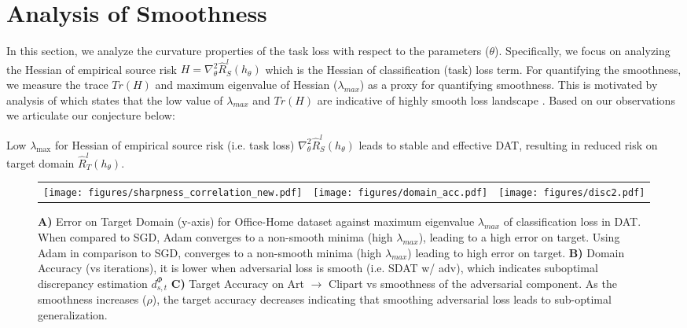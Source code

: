 \documentclass[table,dvipsnames]{article}
\theoremstyle{plain}
\theoremstyle{definition}
\theoremstyle{remark}
\begin{document}
\section{Analysis of Smoothness} \label{smoothness}
In this section, we analyze the curvature properties of the task loss with respect to the parameters ($\theta$). Specifically, we focus on analyzing the Hessian of empirical source risk $H = \nabla^2_{\theta} \hat{R}_S^l(h_{\theta})$ which is the Hessian of classification ({task}) loss term. For quantifying the smoothness, we measure the trace $Tr(H)$ and maximum eigenvalue of Hessian ($\lambda_{max}$) as a proxy for quantifying smoothness. 
This is motivated by analysis of 
which states that the low value of $\lambda_{max}$ and $Tr(H)$ are indicative of highly smooth loss landscape \citep{Jastrzebski2020The}. Based on our observations we articulate our conjecture below: 
\begin{conjecture}
  Low $\lambda_{\max}$ for Hessian  of empirical source risk (i.e. task loss) $\nabla^2_{\theta}\hat{R}_S^l(h_{\theta})$ leads to stable and effective DAT, resulting in reduced risk on target domain  $\hat{R}^l_{T}(h_{\theta})$.
  
\end{conjecture}

\begin{figure*}[t]
\centering
\begin{tabular}{c c c}
\texttt{[image: figures/sharpness\_correlation\_new.pdf]} &   \texttt{[image: figures/domain\_acc.pdf]} & \texttt{[image: figures/disc2.pdf]} \\
\end{tabular}
\caption{\textbf{A)} Error on Target Domain (y-axis) for Office-Home dataset against maximum eigenvalue $\lambda_{max}$ of classification loss in DAT. 
When compared to SGD, Adam converges to a non-smooth minima (high $\lambda_{max}$), leading to a high error on target. 
Using Adam in comparison to SGD, converges to a non-smooth minima (high $\lambda_{max}$) leading to high error on target.
\textbf{B)} Domain Accuracy (vs iterations), it is lower when adversarial loss is smooth (i.e. SDAT w/ adv), which indicates suboptimal discrepancy estimation $d_{s,t}^{\Phi}$ \textbf{C)} Target Accuracy on Art $\rightarrow$ Clipart vs smoothness of the adversarial component. As the smoothness increases ($\rho$), the target accuracy decreases indicating that smoothing adversarial loss leads to sub-optimal generalization.}
\label{fig:2}
\end{figure*}
\end{document}
